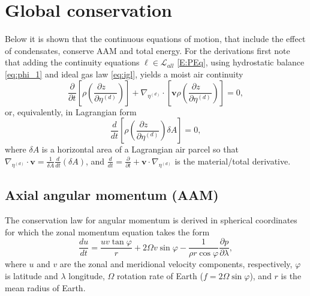 \documentclass{agujournal}
\begin{document}
\section{Global conservation}\label{app:conservation}
Below it is shown that the continuous equations of motion, that include the effect of condensates, conserve AAM and total energy. For the derivations first note that adding the continuity equations $\ell \in \mathcal{L}_{all} $ \eqref{E:PEq}, using hydrostatic balance \eqref{eq:phi_1} and ideal gas law \eqref{eq:igl}, yields a moist air continuity
\begin{equation}
\frac{\partial }{\partial t}\left[ \rho \left(\frac{\partial z\quad}{\partial \eta^{(d)}}\right)\right]+\nabla_{\eta^{(d)}} \cdot \left[ \mathbf{v}\rho  \left( \frac{\partial z\quad }{\partial \eta^{(d)}}\right)\right]=0,\label{eq:cont2}
\end{equation}
or, equivalently, in Lagrangian form
\begin{equation}
\frac{d}{dt}\left[ \rho \left( \frac{\partial z\quad }{\partial \eta^{(d)}}\right)\delta A\right]=0,\label{eq:lagra_cont}
\end{equation}
where $\delta A$ is a horizontal area of a Lagrangian air parcel so that $\nabla_{\eta^{(d)}} \cdot \mathbf{v}=\frac{1}{\delta A}\frac{d}{dt}\left( \delta A\right)$, and  $\frac{d}{dt}=\frac{\partial }{\partial t}+\mathbf{v}\cdot \nabla_{\eta^{(d)}} $ is the material/total derivative. 
\subsection{Axial angular momentum (AAM)}
The conservation law for angular momentum is derived in spherical coordinates for which the zonal momentum equation takes the form
\begin{equation}
\frac{du}{dt}=\frac{u v \tan \varphi}{r}+2\Omega v\sin \varphi -\frac{1}{\rho r \cos \varphi}\frac{\partial p}{\partial \lambda},\label{eq:tmp200}
\end{equation}
where $u$ and $v$ are the zonal and meridional velocity components, respectively, $\varphi$ is latitude and $\lambda$ longitude, $\Omega$ rotation rate of Earth ($f=2\Omega \sin \varphi$), and $r$ is the mean radius of Earth.\\
\end{document}
